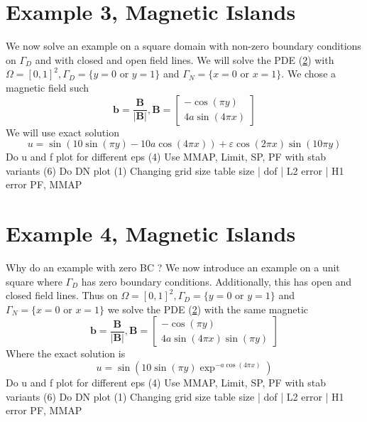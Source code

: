 \documentclass[12pt,a4paper]{article}
\begin{document}
\section{Example 3, Magnetic Islands}
We now solve an example on a square domain with non-zero boundary conditions on $\Gamma_D$ and with closed and open field lines.
We will solve the PDE (\ref{}) with $\Omega = [0,1]^2, \Gamma_D = \{y=0 \text{ or } y=1\}$ and $\Gamma_N = \{x=0 \text{ or } x=1\}$. We chose a magnetic field such 
\begin{equation}
\mathbf{b} = \frac{\mathbf{B}}{|\mathbf{B}|}, 
\mathbf{B} = \left[ \begin{matrix}
-\cos(\pi y)\\
4a \sin(4 \pi x)
\end{matrix} \right]
\end{equation}
We will use exact solution
\begin{equation}
u = \sin(10\sin(\pi y)-10a\cos(4 \pi x)) + \varepsilon \cos(2 \pi x)\sin(10 \pi y)
\end{equation}
Do u and f plot for different eps (4)
Use MMAP, Limit, SP, PF
with stab variants (6)
Do DN plot (1)
Changing grid size table 
size | dof | L2 error | H1 error PF, MMAP

\section{Example 4, Magnetic Islands}
Why do an example with zero BC ?
We now introduce an example on a unit square where $\Gamma_D$ has zero boundary conditions. Additionally, this has open and closed field lines.
Thus on $\Omega = [0,1]^2, \Gamma_D = \{y=0 \text{ or } y=1\}$ and $\Gamma_N = \{x=0 \text{ or } x=1\}$ we solve the PDE (\ref{}) with the same magnetic
\begin{equation}
\mathbf{b} = \frac{\mathbf{B}}{|\mathbf{B}|}, 
\mathbf{B} = \left[ \begin{matrix}
-\cos(\pi y)\\
4a \sin(4 \pi x) \sin(\pi y)
\end{matrix} \right]
\end{equation}
Where the exact solution is 
\begin{equation}
u = \sin(10 \sin(\pi y) \exp^{-a\cos(4 \pi x)}) 
\end{equation}
Do u and f plot for different eps (4)
Use MMAP, Limit, SP, PF
with stab variants (6)
Do DN plot (1)
Changing grid size table 
size | dof | L2 error | H1 error PF, MMAP
\end{document}
